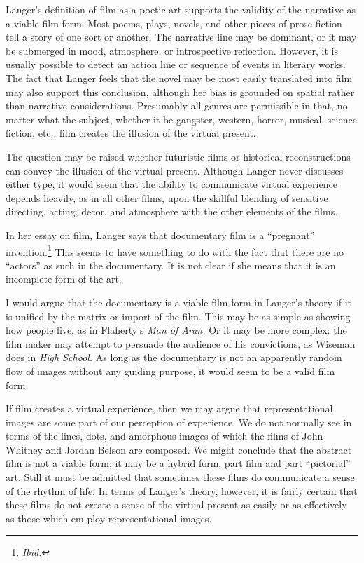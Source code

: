 \documentclass{tufte-handout}
\begin{document}
Langer's definition of film as a poetic art supports the validity of the
narrative as a viable film form. Most poems, plays, novels, and other
pieces of prose fiction tell a story of one sort or another. The
narrative line may be dominant, or it may be submerged in mood,
atmosphere, or introspec­tive reflection. However, it is usually possible
to detect an action line or sequence of events in literary works. The
fact that Langer feels that the novel may be most easily translated into
film may also support this con­clusion, although her bias is grounded on
spatial rather than narrative con­siderations. Presumably all genres are
permissible in that, no matter what the subject, whether it be gangster,
western, horror, musical, science fic­tion, etc., film creates the
illusion of the virtual present.

The question may be raised whether futuristic films or historical
recon­structions can convey the illusion of the virtual present. Although
Langer never discusses either type, it would seem that the ability to
communicate virtual experience depends heavily, as in all other films,
upon the skillful blending of sensitive directing, acting, decor, and
atmosphere with the other elements of the films.

In her essay on film, Langer says that documentary film is a
``pregnant'' invention.\footnote{\emph{Ibid.}} This seems to have
something to do with the fact that there are no ``actors'' as such in
the documentary. It is not clear if she means that it is an incomplete
form of the art.

I would argue that the documentary is a viable film form in Langer's
theory if it is unified by the matrix or import of the film. This may be
as simple as showing how people live, as in Flaherty's \emph{Man of
Aran.} Or it may be more complex: the film maker may attempt to persuade
the audience of his convictions, as Wiseman does in \emph{High School.}
As long as the docu­mentary is not an apparently random flow of images
without any guiding purpose, it would seem to be a valid film form.

If film creates a virtual experience, then we may argue that
representational images are some part of our perception of experience.
We do not nor­mally see in terms of the lines, dots, and amorphous images
of which the films of John Whitney and Jordan Belson are composed. We
might con­clude that the abstract film is not a viable form; it may be a
hybrid form, part film and part ``pictorial'' art. Still it must be
admitted that sometimes these films do communicate a sense of the rhythm
of life. In terms of Langer's theory, however, it is fairly certain that
these films do not create a sense of the virtual present as easily or as
effectively as those which em­ ploy representational images.
\end{document}
